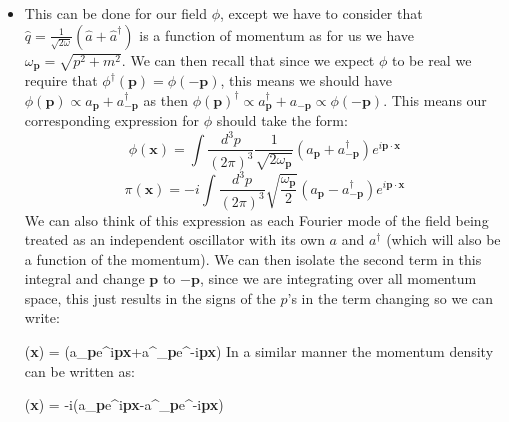 \documentclass[11pt]{article}
\renewenvironment{flalign}{\vspace{-3mm}\empheq[box=\tcbhighmath]{align}}{\endempheq}
\numberwithin{equation}{section}
\begin{document}
\begin{itemize}
\item This can be done for our field $\phi$, except we have to consider that $\hat{q} = \frac{1}{\sqrt{2 \omega}}(\hat{a}+\hat{a}^{\dagger})$ is a function of momentum as for us we have $\omega_{\textbf{p}} = \sqrt{p^2+m^2}$. We can then recall that since we expect $\phi$ to be real we require that $\phi^{\dagger}(\textbf{p}) = \phi(-\textbf{p})$, this means we should have $\phi(\textbf{p}) \propto a_{\textbf{p}}+a^{\dagger}_{-\textbf{p}}$ as then $\phi(\textbf{p})^{\dagger} \propto a_{\textbf{p}}^{\dagger}+ a_{-\textbf{p}} \propto \phi(-\textbf{p})$. This means our corresponding expression for $\phi$ should take the form:
\begin{equation}
\label{phi_1}
  \phi(\textbf{x}) = \int \frac{d^3p}{(2\pi)^3}\frac{1}{\sqrt{2\omega_{\textbf{p}}}}\left(a_{\textbf{p}}+a^{\dagger}_{-\textbf{p}}\right)e^{i\textbf{p}\cdot\textbf{x}} 
\end{equation} 
\begin{equation}
\label{pi_1}
  \pi(\textbf{x}) = -i\int \frac{d^3p}{(2\pi)^3}\sqrt{\frac{\omega_{\textbf{p}}}{2}}\left(a_{\textbf{p}}-a^{\dagger}_{-\textbf{p}}\right)e^{i\textbf{p}\cdot\textbf{x}} 
\end{equation} 
We can also think of this expression as each Fourier mode of the field being treated as an independent oscillator with its own $a$ and $a^{\dagger}$ (which will also be a function of the momentum). We can then isolate the second term in this integral and change $\textbf{p}$ to $-\textbf{p}$, since we are integrating over all momentum space, this just results in the signs of the $p$'s in the term changing so we can write:

\begin{flalign}
\label{phi_2}
  \phi(\textbf{x}) = \int {}\left(a_{\textbf{p}}e^{i\textbf{p}\cdot\textbf{x}}+a^{\dagger}_{\textbf{p}}e^{-i\textbf{p}\cdot\textbf{x}}\right) 
\end{flalign}
In a similar manner the momentum density can be written as:

\begin{flalign}
\label{pi_2}
  \pi(\textbf{x}) = -i\int {}\left(a_{\textbf{p}}e^{i\textbf{p}\cdot\textbf{x}}-a^{\dagger}_{\textbf{p}}e^{-i\textbf{p}\cdot\textbf{x}}\right) 
\end{flalign}
\end{itemize}
\end{document}
